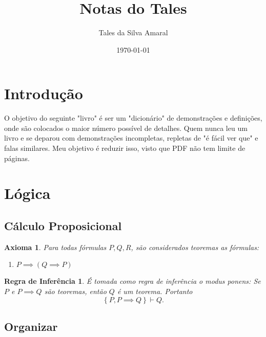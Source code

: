 \documentclass{article}
\title{Notas do Tales}
\author{Tales da Silva Amaral}
\date{\today}
\newtheorem{axioma}{Axioma}
\theoremstyle{theorem}
\theoremstyle{lemma}
\newtheorem{inferencia}{Regra de Inferência}
\theoremstyle{definition}
\theoremstyle{remark}
\begin{document}
\maketitle
\newpage
\tableofcontents
\newpage

\section{Introdução}

O objetivo do seguinte "livro" é ser um "dicionário" de demonstrações e definições, onde são colocados o maior número possível de detalhes. Quem nunca leu um livro e se deparou com demonstrações incompletas, repletas de "é fácil ver que" e falas similares. Meu objetivo é reduzir isso, visto que PDF não tem limite de páginas.

\doclicenseThis

\section{Lógica}
\subsection{Cálculo Proposicional}
\begin{axioma}
	Para todas fórmulas $P, Q, R$, são  considerados teoremas as fórmulas:
	\begin{enumerate}
		\item $P\implies (Q\implies P)$
	\end{enumerate}
\end{axioma}
\begin{inferencia}
	É tomada como regra de inferência o modus ponens:
	Se $P$ e $P\implies Q$ são teoremas, então $Q$ é um teorema. Portanto $$ \left\{ P, P\implies Q \right\} \vdash Q.$$ 
\end{inferencia}
\subsection{Organizar}
\end{document}

